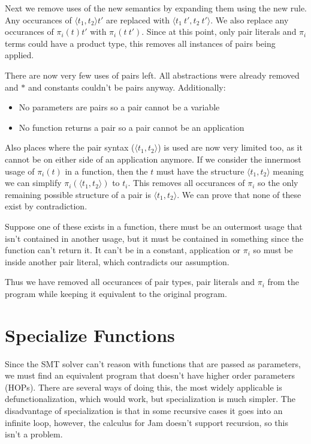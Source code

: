 \documentclass[12pt,a4paper,titlepage]{article}
\begin{document}
    Next we remove uses of the new semantics by expanding them using the new rule.
    Any occurances of $\langle t_1, t_2 \rangle t'$ are replaced with $\langle t_1\ t', t_2\ t' \rangle$.
    We also replace any occurances of $\pi_i(t) t'$ with $\pi_i(t\ t')$.
    Since at this point, only pair literals and $\pi_i$ terms could have a product type, this removes
    all instances of pairs being applied.

    There are now very few uses of pairs left.
    All abstractions were already removed and $\ast$ and constants couldn't be pairs anyway.
    Additionally:
    \begin{itemize}
        \item No parameters are pairs so a pair cannot be a variable
        \item No function returns a pair so a pair cannot be an application
    \end{itemize}

    Also places where the pair syntax ($\langle t_1, t_2 \rangle$) is used are now very limited too, as
    it cannot be on either side of an application anymore.
    If we consider the innermost usage of $\pi_i(t)$ in a function, then the $t$ must have the structure
    $\langle t_1, t_2 \rangle$ meaning we can simplify $\pi_i(\langle t_1, t_2 \rangle)$ to $t_i$.
    This removes all occurances of $\pi_i$ so the only remaining possible structure of a pair is
    $\langle t_1, t_2 \rangle$. We can prove that none of these exist by contradiction.

    Suppose one of these exists in a function, there must be an outermost usage that isn't contained in another
    usage, but it must be contained in something since the function can't return it. It can't be in a constant,
    application or $\pi_i$ so must be inside another pair literal, which contradicts our assumption.

    Thus we have removed all occurances of pair types, pair literals and $\pi_i$ from the program while keeping
    it equivalent to the original program.

    \section{Specialize Functions}
    Since the SMT solver can't reason with functions that are passed as parameters, we must find an equivalent
    program that doesn't have higher order parameters (HOPs).
    There are several ways of doing this, the most widely applicable is defunctionalization, which would work,
    but specialization is much simpler.
    The disadvantage of specialization is that in some recursive cases it goes into an infinite loop, however,
    the calculus for Jam doesn't support recursion, so this isn't a problem.
\end{document}
